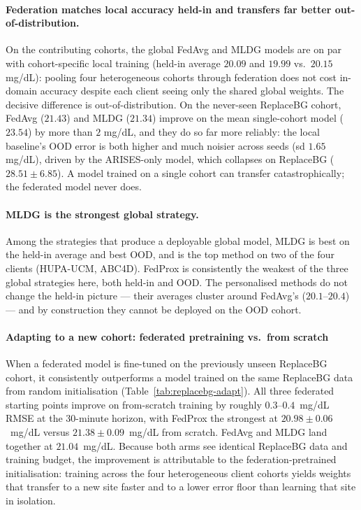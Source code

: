 \documentclass[10pt,letterpaper]{article}
\begin{document}
\paragraph{Federation matches local accuracy held-in and transfers far better
out-of-distribution.} On the contributing cohorts, the global FedAvg and MLDG
models are on par with cohort-specific local training (held-in average $20.09$
and $19.99$ vs.\ $20.15$ mg/dL): pooling four heterogeneous cohorts through
federation does not cost in-domain accuracy despite each client seeing only the
shared global weights. The decisive difference is out-of-distribution. On the
never-seen ReplaceBG cohort, FedAvg ($21.43$) and MLDG ($21.34$) improve on the
mean single-cohort model ($23.54$) by more than $2$ mg/dL, and they do so far
more reliably: the local baseline's OOD error is both higher and much noisier
across seeds (sd $1.65$ mg/dL), driven by the ARISES-only model, which collapses
on ReplaceBG ($28.51 \pm 6.85$). A model trained on a single cohort can transfer
catastrophically; the federated model never does.

\paragraph{MLDG is the strongest global strategy.} Among the strategies that
produce a deployable global model, MLDG is best on the held-in average and best
OOD, and is the top method on two of the four clients (HUPA-UCM, ABC4D). FedProx
is consistently the weakest of the three global strategies here, both held-in and
OOD. The personalised methods do not change the held-in picture --- their
averages cluster around FedAvg's ($20.1$--$20.4$) --- and by construction they
cannot be deployed on the OOD cohort.

\paragraph{Adapting to a new cohort: federated pretraining vs.\ from scratch}

When a federated model is fine-tuned on the previously unseen ReplaceBG cohort,
it consistently outperforms a model trained on the same ReplaceBG data from
random initialisation (Table~\ref{tab:replacebg-adapt}). All three federated
starting points improve on from-scratch training by roughly $0.3$--$0.4$~mg/dL
RMSE at the 30-minute horizon, with FedProx the strongest at
$20.98 \pm 0.06$~mg/dL versus $21.38 \pm 0.09$~mg/dL from scratch.
FedAvg and MLDG land together at $21.04$~mg/dL. Because both arms see identical
ReplaceBG data and training budget, the improvement is attributable to the
federation-pretrained initialisation: training across the four heterogeneous
client cohorts yields weights that transfer to a new site faster and to a lower
error floor than learning that site in isolation.
\end{document}
